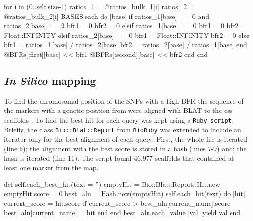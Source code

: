 \begin{code}[language=Ruby,caption=Section of the code that , label=lst:yr15:bfr]
for i in (0..self.size-1)
  ratios_1 = @ratios_bulk_1[i]
  ratios_2 = @ratios_bulk_2[i]
  BASES.each do |base| 
    if ratios_1[base] == 0 and ratios_2[base] == 0
      bfr1 = 0
      bfr2 = 0
    elsif ratios_1[base] == 0
      bfr1 = 0
      bfr2 = Float::INFINITY
    elsif ratios_2[base] == 0
      bfr1 = Float::INFINITY
      bfr2 = 0
    else
      bfr1 = ratios_1[base] / ratios_2[base]
      bfr2 = ratios_2[base] / ratios_1[base]
    end
    @BFRs[:first][base] << bfr1
    @BFRs[:second][base] << bfr2
  end
end
\end{code}

\subsection{\textit{In Silico} mapping}
\label{yr15:met:inSilico}

To find the chromosomal position of the SNPs with a high BFR the sequence of the markers with a genetic position from \citet{Wang2014} were aligned with BLAT \citep{Kent2002} to the \acrshort{css} scaffolds \citep{Mayer2014}. 
To find the best hit for each query was kept using a \texttt{Ruby script}. 
Briefly, the class \texttt{Bio::Blat::Report} from \texttt{BioRuby} \citep{Goto2010} was extended to include an iterator only for the best alignment of each query: 
First, the whole file is iterated (line 5); the alignment with the best score is stored in a hash (lines 7-9) and; the hash is iterated (line 11).
The script found 46,977 scaffolds that contained at least one marker from the map. 

\begin{code}[language=Ruby, caption={[\texttt{Bio::Blat::Report.each\_best\_hit}] Extension to \texttt{Bio::Blat::Report} that selects the best alignment from a \texttt{psl file from BLAT}}, label=lst:yr15:bestHit]
def self.each_best_hit(text = '')
  emptyHit = Bio::Blat::Report::Hit.new
  emptyHit.score = 0
  best_aln = Hash.new(emptyHit)
  self.each_hit(text) do |hit|
    current_score = hit.score
    if current_score > best_aln[current_name].score
      best_aln[current_name] = hit 
    end
  end
  best_aln.each_value { |val| yield  val }
end
\end{code}

